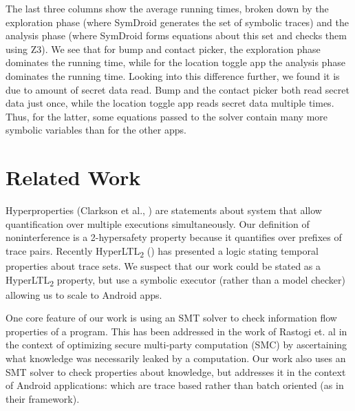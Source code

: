 \documentclass{entcs} \usepackage{entcsmacro}
\newcommand{\comment}[3][\color{red}]{{#1{[{#2}: {#3}]}}}
\newcommand{\jeff}[1]{\comment[\color{green}]{JSF}{#1}}
\begin{document}

The last three columns show the average running times, broken
down by the exploration phase (where SymDroid generates the set
of symbolic traces) and the analysis phase (where SymDroid forms
equations about this set and checks them using Z3). We see that for bump and contact picker,
the exploration phase dominates the running time, while for the
location toggle app the analysis phase dominates the running time.
Looking into this difference further, we found it is due to amount of
secret data read. Bump and the contact picker both read secret data
just once, while the location toggle app reads secret data multiple
times. Thus, for the latter, some equations passed to the solver
contain many more symbolic variables than for the other apps.

\section{Related Work}
\label{sec:related-work}

Hyperproperties (Clarkson et al., \cite{Clarkson:10}) are statements
about system that allow quantification over multiple executions
simultaneously.  Our definition of noninterference is a 2-hypersafety
property because it quantifies over prefixes of trace pairs.  Recently
HyperLTL\textsubscript{2} (\cite{Clarkson:2014}) has presented a logic
stating temporal properties about trace sets.  We suspect that our
work could be stated as a HyperLTL\textsubscript{2} property, but use
a symbolic executor (rather than a model checker) allowing us to scale
to Android apps.

One core feature of our work is using an SMT solver to check
information flow properties of a program.  This has been addressed in
the work of Rastogi et. al \cite{Rastogi:13} in the context of
optimizing secure multi-party computation (SMC) by ascertaining what
knowledge was necessarily leaked by a computation.  Our work also uses
an SMT solver to check properties about knowledge, but addresses it in
the context of Android applications: which are trace based rather than
batch oriented (as in their framework).
\end{document}
